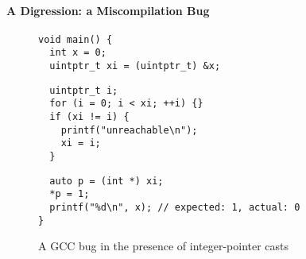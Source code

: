 


\paragraph{A Digression: a Miscompilation Bug}

\begin{figure}[t]
\begin{center}
\small
\begin{minipage}{0.5\textwidth}
\begin{verbatim}
void main() { 
  int x = 0;
  uintptr_t xi = (uintptr_t) &x;
\end{verbatim}
\vskip -0.7cm
\begin{verbatim}
  uintptr_t i;
  for (i = 0; i < xi; ++i) {}
  if (xi != i) {
    printf("unreachable\n");
    xi = i;
  }
\end{verbatim}
\vskip -0.7cm
\begin{verbatim}
  auto p = (int *) xi;
  *p = 1;
  printf("%d\n", x); // expected: 1, actual: 0
}
\end{verbatim}
\end{minipage}
\end{center}
\caption{A GCC bug in the presence of integer-pointer casts}
\label{fig:introduction:bug}
\end{figure}

